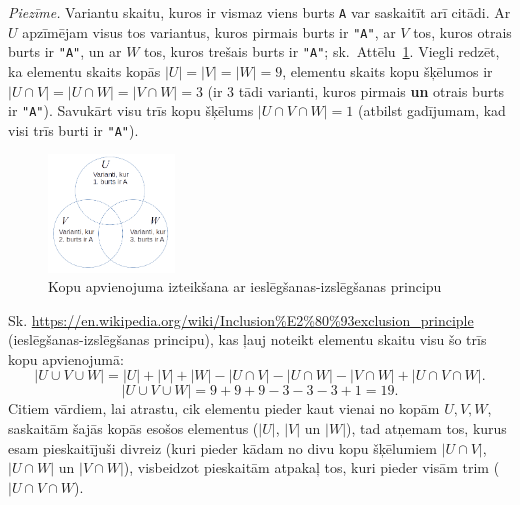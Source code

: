 \documentclass[11pt]{article}
\begin{document}


{\em Piezīme.} Variantu skaitu, kuros ir vismaz viens burts {\tt A} var saskaitīt arī citādi.
Ar $U$ apzīmējam visus tos variantus, kuros
pirmais burts ir {\tt "A"}, ar $V$ \textendash{} tos, kuros otrais burts ir {\tt "A"}, un ar
$W$ \textendash{} tos, kuros trešais burts ir {\tt "A"}; sk.\ Attēlu~\ref{fig:venn-diagram}. Viegli redzēt, ka elementu skaits
kopās $|U|=|V|=|W|=9$, elementu skaits kopu šķēlumos ir $|U \cap V| = |U \cap W| = |V \cap W| = 3$
(ir $3$ tādi varianti, kuros pirmais {\bf un} otrais burts ir {\tt "A"}). Savukārt visu
trīs kopu šķēlums $|U \cap V \cap W| = 1$ (atbilst gadījumam, kad visi trīs
burti ir {\tt "A"}).


\begin{figure}[h!]
\begin{center}
\includegraphics[width=0.3\textwidth]{venn-diagram.png}
\caption{Kopu apvienojuma izteikšana ar ieslēgšanas-izslēgšanas principu\label{fig:venn-diagram}}
\end{center}
\end{figure}

Sk. \url{https://en.wikipedia.org/wiki/Inclusion%E2%80%93exclusion_principle} (ieslēgšanas-izslēgšanas principu),
kas ļauj noteikt elementu skaitu visu šo trīs kopu apvienojumā:
\[ \left| U \cup V \cup W \right| = \left| U \right| + \left| V \right| + \left| W \right| -
\left| U \cap V \right| - \left| U \cap W \right| - \left| V \cap W \right| + \left| U \cap V \cap W \right|. \]
\[ \left| U \cup V \cup W \right| = 9+9+9 - 3 - 3 - 3+1 = 19. \]
Citiem vārdiem, lai atrastu, cik elementu pieder kaut vienai no kopām $U,V,W$, saskaitām
šajās kopās esošos elementus ($|U|$, $|V|$ un $|W|$), tad atņemam tos, kurus esam pieskaitījuši
divreiz (kuri pieder kādam no divu kopu šķēlumiem
$|U \cap V|$, $|U \cap W|$ un $|V \cap W|$), visbeidzot pieskaitām atpakaļ
tos, kuri pieder visām trim ($|U \cap V \cap W$).
\end{document}
